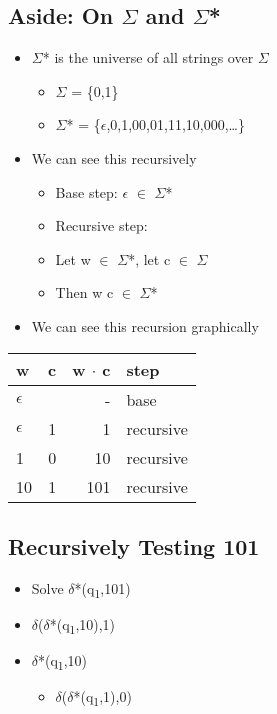 \documentclass[11pt]{article}
\begin{document}
\subsection{Aside: On \(\Sigma\) and \(\Sigma\)*}
\label{sec:orgacd09b2}
\begin{itemize}
\item \(\Sigma\)* is the universe of all strings over \(\Sigma\)
\begin{itemize}
\item \(\Sigma\) = \{0,1\}
\item \(\Sigma\)* = \{\(\epsilon\),0,1,00,01,11,10,000,\ldots{}\}
\end{itemize}
\item We can see this recursively
\begin{itemize}
\item Base step: \(\epsilon\) \(\in\) \(\Sigma\)*
\item Recursive step:
\item Let w \(\in\) \(\Sigma\)*, let c \(\in\) \(\Sigma\)
\item Then w \texttimes{} c \(\in\) \(\Sigma\)*
\end{itemize}
\item We can see this recursion graphically
\end{itemize}
\begin{center}
\begin{tabular}{lrrl}
w & c & w \(\cdot\) c & step\\
\hline
\(\epsilon\) &  & - & base\\
\(\epsilon\) & 1 & 1 & recursive\\
1 & 0 & 10 & recursive\\
10 & 1 & 101 & recursive\\
\end{tabular}
\end{center}
\subsection{Recursively Testing 101}
\label{sec:orgf9eacbf}
\begin{itemize}
\item Solve \(\delta\)*(q\textsubscript{1},101)
\item \(\delta\)(\(\delta\)*(q\textsubscript{1},10),1)
\item \(\delta\)*(q\textsubscript{1},10)
\begin{itemize}
\item \(\delta\)(\(\delta\)*(q\textsubscript{1},1),0)
\end{itemize}
\end{itemize}
\end{document}
